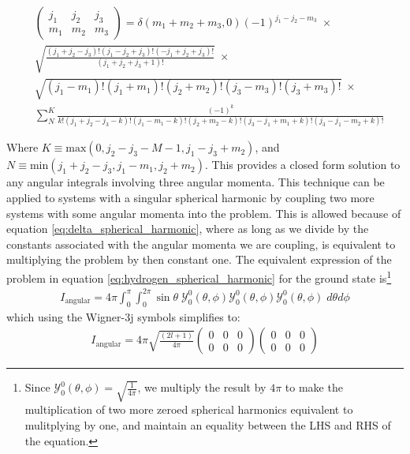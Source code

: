         \begin{align}
            &\begin{pmatrix}
                j_1 & j_2 & j_3\\
                m_1 & m_2 & m_3
            \end{pmatrix} = \delta(m_1 + m_2 + m_3, 0) (-1)^{j_1 - j_2 - m_3} \;\times \\
            & \sqrt{\frac{(j_1 + j_2 - j_3)! (j_1 - j_2 + j_3)!(-j_1 + j_2 + j_3)!}{(j_1 + j_2 + j_3 + 1)!}} \;\times \nonumber \\
            &\sqrt{(j_1 - m_1)!(j_1 + m_1)!(j_2 + m_2)!(j_3 - m_3)! (j_3 + m_3)!} \;\times \nonumber\\
             &\sum_{N}^{K} \frac{(-1)^k}{k!(j_1 + j_2 - j_3 - k)!(j_1 - m_1 - k)!(j_2  + m_2 - k)!(j_3 - j_1 + m_1 + k)!(j_3 - j_1 - m_2 + k)!}\nonumber
        \end{align}

        \noindent Where $K \equiv \text{max}(0, j_2 - j_3 - M-1, j_1 - j_3 + m_2)$, and $N \equiv \text{min}(j_1 + j_2 - j_3, j_1 - m_1, j_2 + m_2)$. This provides a closed form solution to any angular integrals involving three angular momenta. This technique can be applied to systems with a singular spherical harmonic by coupling two more systems with some angular momenta into the problem. This is allowed because of equation \eqref{eq:delta_spherical_harmonic}, where as long as we divide by the constants associated with the angular momenta we are coupling, is equivalent to multiplying the problem by then constant one. The equivalent expression of the problem in equation \eqref{eq:hydrogen_spherical_harmonic} for the ground state is\footnote{Since $\mathcal{Y}^0_0 (\theta, \phi) = \sqrt{\frac{1}{4\pi}}$, we multiply the result by $4\pi$ to make the multiplication of two more zeroed spherical harmonics equivalent to mulitplying by one, and maintain an equality between the LHS and RHS of the equation.}
            \begin{align}
                I_{\text{angular}} = 4\pi \int_0^\pi \int_0^{2\pi}\sin \theta \;\mathcal{Y}^0_0 (\theta, \phi) \mathcal{Y}^0_0 (\theta, \phi) \mathcal{Y}^0_0 (\theta, \phi)\; d\theta d\phi
            \end{align}
        which using the Wigner-3j symbols simplifies to:
        \begin{align}
            I_{\text{angular}} = 4\pi \sqrt{\frac{(2l + 1)}{4 \pi}} \begin{pmatrix}
                0 & 0 & 0 \\
                0 & 0 & 0
            \end{pmatrix} \begin{pmatrix}
                0 & 0 & 0 \\
                0 & 0 & 0 
            \end{pmatrix} \nonumber
        \end{align}

